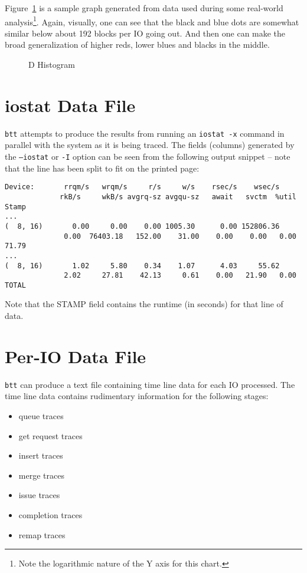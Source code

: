 \documentclass{article}
\begin{document}
  Figure~\ref{fig:dhist} is a sample graph generated from data used during
  some real-world analysis\footnote{Note the logarithmic nature of the
  Y axis for this chart.}. Again, visually, one can see that the black
  and blue dots are somewhat similar below about 192 blocks per IO going
  out. And then one can make the broad generalization of higher reds,
  lower blues and blacks in the middle.

  \begin{figure}[hb]
  \leavevmode\centering
  \caption{\label{fig:dhist}D Histogram}
  \end{figure}

\newpage\section{\label{sec:iostat}iostat Data File}
  \texttt{btt} attempts to produce the results from running an
  \texttt{iostat -x} command in parallel with the system as it is being
  traced. The fields (columns) generated by the \texttt{--iostat} or
  \texttt{-I} option can be seen from the following output snippet --
  note that the line has been split to fit on the printed page:

\begin{verbatim}
Device:       rrqm/s   wrqm/s     r/s     w/s    rsec/s    wsec/s
             rkB/s     wkB/s avgrq-sz avgqu-sz   await   svctm  %util   Stamp
...
(  8, 16)       0.00     0.00    0.00 1005.30      0.00 152806.36     
              0.00  76403.18   152.00    31.00    0.00    0.00   0.00   71.79
...
(  8, 16)       1.02     5.80    0.34    1.07      4.03     55.62
              2.02     27.81    42.13     0.61    0.00   21.90   0.00   TOTAL
\end{verbatim}

  Note that the STAMP field contains the runtime (in seconds) for that
  line of data.

\newpage\section{\label{sec:per-io}Per-IO Data File}

  \texttt{btt} can produce a text file containing time line data for each
  IO processed. The time line data contains rudimentary information for
  the following stages:

  \begin{itemize}
    \item queue traces
    \item get request traces
    \item insert traces
    \item merge traces
    \item issue traces
    \item completion traces
    \item remap traces
  \end{itemize}
\end{document}
